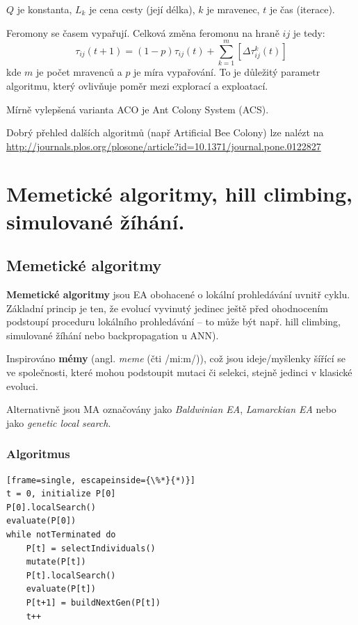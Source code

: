 $Q$ je konstanta, $L_k$ je cena cesty (její délka), $k$ je mravenec, $t$ je čas (iterace).

Feromony se časem vypařují. Celková změna feromonu na hraně $ij$ je tedy:
$$\tau_{ij}(t+1) = (1-p)\tau_{ij}(t) + \sum_{k=1}^m [\Delta\tau^k_{ij}(t)]$$
kde $m$ je počet mravenců a $p$ je míra vypařování. To je důležitý parametr algoritmu, který ovlivňuje poměr mezi explorací a exploatací.

Mírně vylepšená varianta ACO je Ant Colony System (ACS).

Dobrý přehled dalších algoritmů (např Artificial Bee Colony) lze nalézt na \url{http://journals.plos.org/plosone/article?id=10.1371/journal.pone.0122827}






\section{Memetické algoritmy, hill climbing, simulované žíhání.}
\subsection{Memetické algoritmy}

\textbf{Memetické algoritmy} jsou EA obohacené o lokální prohledávání uvnitř cyklu. Základní princip je ten, že evolucí vyvinutý jedinec ještě před ohodnocením podstoupí proceduru lokálního prohledávání -- to může být např. hill climbing, simulované žíhání nebo backpropagation u ANN). 

Inspirováno \textbf{mémy} (angl. \textit{meme} (čti /mi:m/)), což jsou ideje/myšlenky šířící se ve společnosti, které mohou podstoupit mutaci či selekci, stejně jedinci v klasické evoluci. 

Alternativně jsou MA označovány jako \textit{Baldwinian EA}, \textit{Lamarckian EA} nebo jako \textit{genetic local search}.

\subsubsection{Algoritmus}
\begin{minipage}{\linewidth}
	\begin{lstlisting}[frame=single, escapeinside={\%*}{*)}]
t = 0, initialize P[0]
P[0].localSearch()
evaluate(P[0])
while notTerminated do
	P[t] = selectIndividuals()
	mutate(P[t])
	P[t].localSearch()
	evaluate(P[t])
	P[t+1] = buildNextGen(P[t])
	t++

	\end{lstlisting}
\end{minipage}

